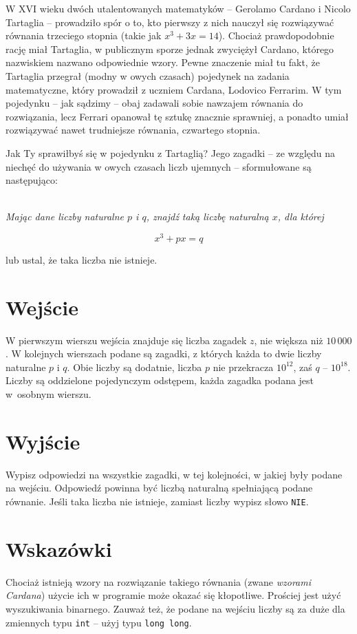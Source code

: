\documentclass{spiral-kurs}
\begin{document}
\makeheader
%
   W XVI wieku dwóch utalentowanych matematyków -- Gerolamo Cardano i Nicolo Tartaglia -- prowadziło spór o to, kto pierwszy z nich nauczył się rozwiązywać równania trzeciego stopnia (takie jak $x^3 + 3x = 14$).
   Chociaż prawdopodobnie rację miał Tartaglia, w publicznym sporze jednak zwyciężył Cardano, którego nazwiskiem nazwano odpowiednie wzory. Pewne znaczenie miał tu fakt, że Tartaglia przegrał (modny w owych czasach)
pojedynek na zadania matematyczne, który prowadził z uczniem Cardana, Lodovico Ferrarim.
   W tym pojedynku -- jak sądzimy -- obaj zadawali sobie nawzajem równania do rozwiązania, lecz Ferrari opanował tę sztukę znacznie sprawniej, a ponadto umiał rozwiązywać nawet trudniejsze równania, czwartego stopnia.

   Jak Ty sprawiłbyś się w pojedynku z Tartaglią? Jego zagadki -- ze względu na niechęć do używania w owych czasach liczb ujemnych -- sformułowane są następująco: \\\

   { \it
   Mając dane liczby naturalne $p$ i $q$, znajdź taką liczbę naturalną $x$, dla której

	$$x^3 + px = q$$

   lub ustal, że taka liczba nie istnieje.
   }

   \section{Wejście}
   W pierwszym wierszu wejścia znajduje się liczba zagadek $z$, nie większa niż $10\,000$. W kolejnych wierszach podane są zagadki, z których każda to dwie liczby naturalne $p$ i $q$. Obie liczby są dodatnie, liczba $p$ nie przekracza $10^{12}$, zaś $q$ -- $10^{18}$.
Liczby są oddzielone pojedynczym odstępem, każda zagadka podana jest w~osobnym wierszu.
  \section{Wyjście}
  Wypisz odpowiedzi na wszystkie zagadki, w tej kolejności, w jakiej były podane na wejściu. Odpowiedź powinna być liczbą naturalną spełniającą podane równanie. Jeśli taka liczba nie istnieje, zamiast liczby wypisz słowo {\tt NIE}.

  \section{Wskazówki}
  Chociaż istnieją wzory na rozwiązanie takiego równania (zwane {\it wzorami Cardana}) użycie ich w programie może okazać się kłopotliwe. Prościej jest użyć wyszukiwania binarnego.
Zauważ też, że podane na wejściu liczby są za duże dla zmiennych typu {\tt int} -- użyj typu {\tt long long}.


  
\end{document}
